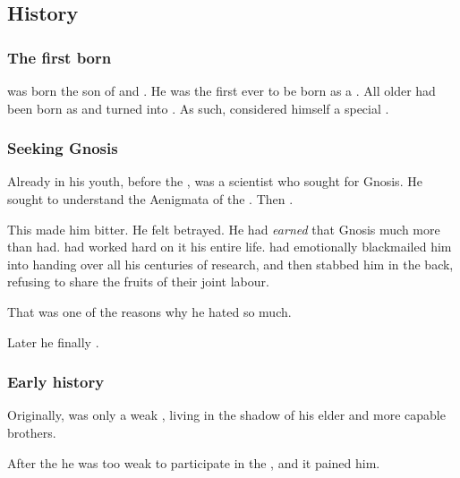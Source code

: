 \subsection{History}





\subsubsection{The first born \dragon}
\Secherdamon was born the son of \Tiamat and \ApepNesthra. 
He was the first \dragon ever to be born as a \dragon.
All older \dragons had been born as \ophidians and turned into \dragons. 
As such, \Secherdamon considered himself a special . 





\subsubsection{Seeking Gnosis}
Already in his youth, before the \secondbanewar, \Secherdamon{} was a scientist who sought for Gnosis. 
He sought to understand the Aenigmata of the \xss. 
Then .

This made him bitter. 
He felt betrayed. 
He had \emph{earned} that Gnosis much more than \Ishnaruchaefir{} had.
\Secherdamon{} had worked hard on it his entire life. 
\Ishnaruchaefir{} had emotionally blackmailed him into handing over all his centuries of research, and then stabbed him in the back, refusing to share the fruits of their joint labour. 

That was one of the reasons why he hated \Ishnaruchaefir{} so much. 

Later he finally . 





\subsubsection{Early history}
Originally, \HriistD{} was only a weak \vertex, living in the shadow of his elder and more capable brothers. 

After the  he was too weak to participate in the , and it pained him. 





